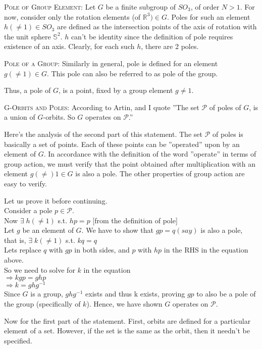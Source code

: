 \documentclass[12pt]{article}
\begin{document}
\textsc {Pole of Group Element: } Let $G$ be a finite subgroup of $SO_{3}$, of order $N > 1$. For now, consider only the rotation elements (of $\mathbb{R}^3) \in G$. Poles for such an element $h(\neq 1) \in SO_{3}$ are defined as the intersection points of the axis of rotation with the unit sphere $\mathbb{S}^2$. $h$ can't be identity since the definition of pole requires existence of an axis. Clearly, for each such $h$, there are 2 poles.
\par
\textsc {Pole of a Group: } Similarly in general, pole is defined for an element $g(\neq 1) \in G$. This pole can also be referred to as pole of the group.
\par
Thus, a pole of $G$, is a point, fixed by a group element $g \neq 1$.\\
\par
\textsc {G-Orbits and Poles: } According to Artin, and I quote ''The set $\mathcal P$ of poles of $G$, is a union of $G$-orbits. So $G$ operates on $\mathcal P$.''
\par
Here's the analysis of the second part of this statement. The set $\mathcal P$ of poles is basically a set of points. Each of these points can be ''operated'' upon by an element of $G$. In accordance with the definition of the word ''operate'' in terms of group action, we must verify that the point obtained after multiplication with an element $g(\neq) 1 \in G$ is also a pole. The other properties of group action are easy to verify.
\par
Let us prove it before continuing.\\ Consider a pole $p \in \mathcal P$.\\
Now $\exists\;h(\neq 1)$ s.t. $hp=p$ \hfill [from the definition of pole]\\
Let $g$ be an element of $G$. We have to show that $gp=q (say)$ is also a pole,\\
that is, $\exists\;k(\neq 1)$ s.t. $kq=q$\\
Lets replace $q$ with $gp$ in both sides, and $p$ with $hp$ in the RHS in the equation above.\\
So we need to solve for $k$ in the equation\\
$\Rightarrow kgp=ghp$\\
$\Rightarrow k=ghg^{-1}$\\
Since $G$ is a group, $ghg^{-1}$ exists and thus k exists, proving $gp$ to also be a pole of the group (specifically of $k$). Hence, we have shown $G$ operates on $\mathcal P$.
\par
Now for the first part of the statement. First, orbits are defined for a particular element of a set. However, if the set is the same as the orbit, then it needn't be specified.\\
\end{document}
